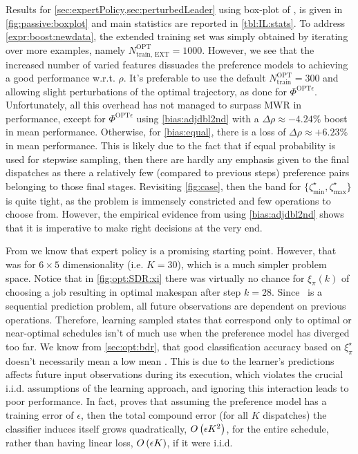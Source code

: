 \documentclass[twocolumn]{svjour3}
\begin{document}
Results for \cref{sec:expertPolicy,sec:perturbedLeader} using  
box-plot of \namerho, is given in \cref{fig:passive:boxplot} and main 
statistics are reported in \cref{tbl:IL:stats}. 
To address \ref{expr:boost:newdata}, the extended training set was simply 
obtained by iterating over more examples, namely $N^{\text{OPT}}_{\text{train, 
EXT}}=1000$. However, we see that the increased number of varied features 
dissuades the preference models to achieving a good performance w.r.t. $\rho$. 
It's preferable to use the default $N^{\text{OPT}}_{\text{train}}=300$ and 
allowing slight perturbations of the optimal trajectory, as done for 
$\Phi^{\text{OPT}\epsilon}$. Unfortunately, all this overhead has not managed 
to surpass MWR in performance, except for $\Phi^{\text{OPT}\epsilon}$ using 
\ref{bias:adjdbl2nd} with a $\Delta\rho\approx-4.24\%$ boost in mean 
performance. Otherwise, for \ref{bias:equal}, there is a loss of 
$\Delta\rho\approx+6.23\%$ in mean performance. 
This is likely due to the fact that if equal probability is used for stepwise 
sampling, then there are hardly any emphasis given to the final dispatches as 
there a relatively few (compared to previous steps) preference pairs belonging 
to those final stages.
Revisiting \cref{fig:case}, then the band for 
$\{\zeta^{\star}_{\min},\zeta^{\star}_{\max}\}$ is quite tight, as the problem 
is immensely constricted and few operations to choose from. However, the 
empirical evidence from using \ref{bias:adjdbl2nd} shows that it is 
imperative to make right decisions at the very end.

From \cite{InRu11a} we know that expert policy is a promising starting point.
However, that was for $6\times5$ dimensionality (i.e. $K=30$), which is a much 
simpler problem space. Notice that in \cref{fig:opt:SDR:xi} there was 
virtually no chance for $\xi_\pi(k)$ of choosing a job resulting in optimal 
makespan after step $k=28$.
Since \jsp\ is a sequential prediction problem, all future observations are 
dependent on previous operations. 
Therefore, learning sampled states that correspond only to optimal or 
near-optimal schedules isn't of much use when the preference model has 
diverged too far. We know from \cref{sec:opt:bdr}, that good classification 
accuracy based on $\xi^\star_\pi$ doesn't necessarily mean a low mean \namerho.
This is due to the learner's predictions affects future input observations 
during its execution, which violates the crucial i.i.d. assumptions of the 
learning approach, and ignoring this interaction leads to poor performance.
In fact, \cite{RossB10} proves that assuming the preference model has a 
training error of $\epsilon$, then the total compound error (for all $K$ 
dispatches) the classifier induces itself grows quadratically, ${O}\left(\epsilon 
K^2\right)$, for the entire schedule, rather than having linear loss, 
${O}\left(\epsilon K\right)$, if it were i.i.d.
\end{document}
